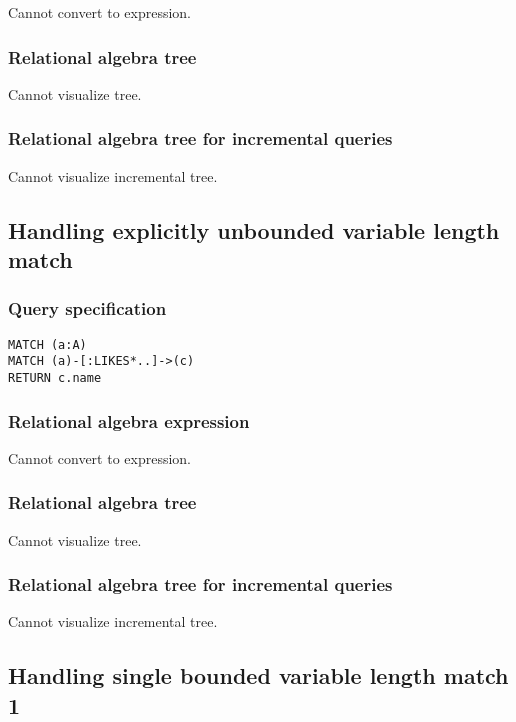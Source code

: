 Cannot convert to expression.

\subsubsection*{Relational algebra tree}

Cannot visualize tree.

\subsubsection*{Relational algebra tree for incremental queries}

Cannot visualize incremental tree.

\subsection{Handling explicitly unbounded variable length match}

\subsubsection*{Query specification}

\begin{lstlisting}
MATCH (a:A)
MATCH (a)-[:LIKES*..]->(c)
RETURN c.name
\end{lstlisting}

\subsubsection*{Relational algebra expression}

Cannot convert to expression.

\subsubsection*{Relational algebra tree}

Cannot visualize tree.

\subsubsection*{Relational algebra tree for incremental queries}

Cannot visualize incremental tree.

\subsection{Handling single bounded variable length match 1}

